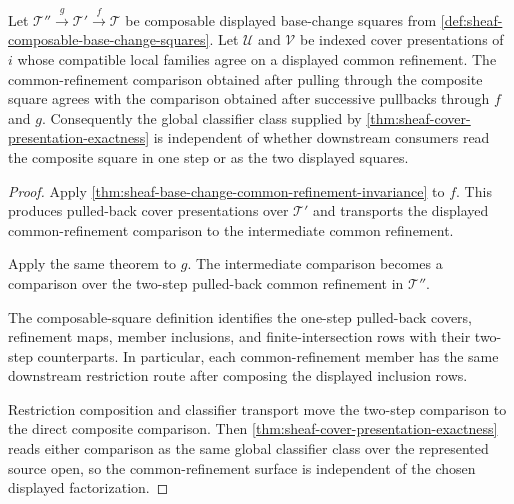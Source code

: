\begin{theorem}
\label{thm:sheaf-base-change-common-refinement-composition}
Let $\mathcal{T}''\xrightarrow{g}\mathcal{T}'\xrightarrow{f}\mathcal{T}$ be composable displayed base-change squares from \autoref{def:sheaf-composable-base-change-squares}. Let $\mathcal{U}$ and $\mathcal{V}$ be indexed cover presentations of $i$ whose compatible local families agree on a displayed common refinement. The common-refinement comparison obtained after pulling through the composite square agrees with the comparison obtained after successive pullbacks through $f$ and $g$. Consequently the global classifier class supplied by \autoref{thm:sheaf-cover-presentation-exactness} is independent of whether downstream consumers read the composite square in one step or as the two displayed squares.
\end{theorem}
\begin{proof}
Apply \autoref{thm:sheaf-base-change-common-refinement-invariance} to $f$. This produces pulled-back cover presentations over $\mathcal{T}'$ and transports the displayed common-refinement comparison to the intermediate common refinement.

Apply the same theorem to $g$. The intermediate comparison becomes a comparison over the two-step pulled-back common refinement in $\mathcal{T}''$.

The composable-square definition identifies the one-step pulled-back covers, refinement maps, member inclusions, and finite-intersection rows with their two-step counterparts. In particular, each common-refinement member has the same downstream restriction route after composing the displayed inclusion rows.

Restriction composition and classifier transport move the two-step comparison to the direct composite comparison. Then \autoref{thm:sheaf-cover-presentation-exactness} reads either comparison as the same global classifier class over the represented source open, so the common-refinement surface is independent of the chosen displayed factorization.
\end{proof}

